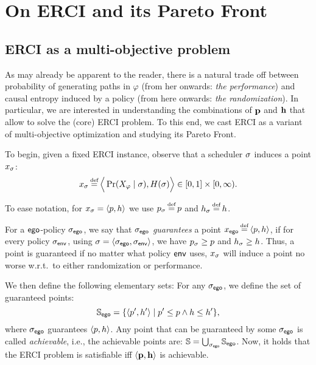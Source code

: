 \section{On ERCI and its Pareto Front}\label{sec:convex}
\subsection{ERCI as a multi-objective problem}
As may already be apparent to the reader, there is a natural trade off
between probability of generating paths in $\varphi$ (from her
onwards: \emph{the performance}) and causal entropy induced by a
policy (from here onwards: \emph{the randomization}).  In particular,
we are interested in understanding the combinations of $\mathbf{p}$
and $\mathbf{h}$ that allow to solve the (core) ERCI problem. To this
end, we cast ERCI as a variant of multi-objective optimization and
studying its Pareto Front.

To begin, given a fixed ERCI instance, observe that a scheduler $\sigma$
induces a point $x_\sigma$:
\begin{equation}
  x_\sched \eqdef \Big\langle \Pr(X_\varphi \mid \sched), H(\sched) \Big\rangle \in [0,1] \times [0,\infty).  
\end{equation}

To ease notation, for $x_\sigma = \langle p,h \rangle$ we use
$\scp_\sched \eqdef \scp$ and $\rndp_\sched \eqdef \rndp$.

For a $\mathsf{ego}$-policy ${\sigma_{\mathsf{ego}}}$, we say that ${\sigma_{\mathsf{ego}}}$
\emph{guarantees} a point $x_\pOne \eqdef \langle \scp, \rndp
\rangle$, if for every policy ${\sigma_{\mathsf{env}}}$, using $\sigma = \langle
{\sigma_{\mathsf{ego}}}, {\sigma_{\mathsf{env}}} \rangle$, we have $p_\sigma \geq p$ and
$h_\sigma \geq h$. Thus, a point is guaranteed if no matter
what policy $\mathsf{env}$ uses, $x_\sigma$ will induce a point no worse
w.r.t.\ to either randomization or performance.

We then define the following elementary sets:
For any ${\sigma_{\mathsf{ego}}}$, we define the set of guaranteed points:
\begin{equation}\label{eq:guaranteed}
\solutions_\pOne = \{ \langle \scp', \rndp' \rangle \mid \scp' \leq \scp \wedge \rndp \leq \rndp'\},
\end{equation}
where ${\sigma_{\mathsf{ego}}}$ guarantees $\langle p, h \rangle$.
Any point that can be guaranteed by some ${\sigma_{\mathsf{ego}}}$ is called \emph{achievable}, i.e., the achievable points are:   	
 $ \mathbb{S} = \bigcup_{{\sigma_{\mathsf{ego}}}} \mathbb{S}_{\mathsf{ego}}$.
Now, it holds that the ERCI problem is satisfiable iff $\langle \mathbf{p}, \mathbf{h} \rangle$ is achievable.  


